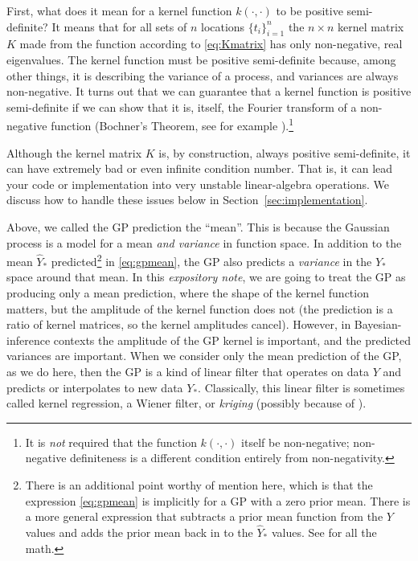 \documentclass[12pt,letterpaper]{article}
\newcommand{\documentname}{\textsl{expository note}}
\newcommand{\sectionname}{Section}
\begin{document}
First, what does it mean for a kernel function $k(\cdot,\cdot)$ to be positive semi-definite?
It means that for all sets of $n$ locations $\{t_i\}_{i=1}^n$ the $n\times n$ kernel matrix $K$ made from the function according to \eqref{eq:Kmatrix} has only non-negative, real eigenvalues.
The kernel function must be positive semi-definite because, among other things, it is describing the variance of a process, and variances are always non-negative.
It turns out that we can guarantee that a kernel function is positive semi-definite if we can show that it is, itself, the Fourier transform of a non-negative function (Bochner's Theorem, see for example \citealt{folland2016course}).\footnote{It is \emph{not} required that the function $k(\cdot,\cdot)$ itself be non-negative; non-negative definiteness is a different condition entirely from non-negativity.}

Although the kernel matrix $K$ is, by construction, always positive semi-definite, it can have extremely bad or even infinite condition number. That is, it can lead your code or implementation into very unstable linear-algebra operations. We discuss how to handle these issues below in \sectionname~\ref{sec:implementation}.

Above, we called the GP prediction the ``mean''. This is because the Gaussian process is a model for a mean \emph{and variance} in function space.
In addition to the mean $\hat{Y}_\ast$ predicted\footnote{There is an additional point worthy of mention here, which is that the expression \eqref{eq:gpmean} is implicitly for a GP with a zero prior mean. There is a more general expression that subtracts a prior mean function from the $Y$ values and adds the prior mean back in to the $\hat{Y}_\ast$ values. See \citet{gpml} for all the math.} in \eqref{eq:gpmean}, the GP also predicts a \emph{variance} in the $Y_\ast$ space around that mean.
In this \documentname, we are going to treat the GP as producing only a mean prediction, where the shape of the kernel function matters, but the amplitude of the kernel function does not (the prediction is a ratio of kernel matrices, so the kernel amplitudes cancel).
However, in Bayesian-inference contexts the amplitude of the GP kernel is important, and the predicted variances are important.
When we consider only the mean prediction of the GP, as we do here, then the GP is a kind of linear filter that operates on data $Y$ and predicts or interpolates to new data $Y_\ast$.
Classically, this linear filter is sometimes called kernel regression, a Wiener filter, or \emph{kriging} (possibly because of \citealt{krige}).
\end{document}
